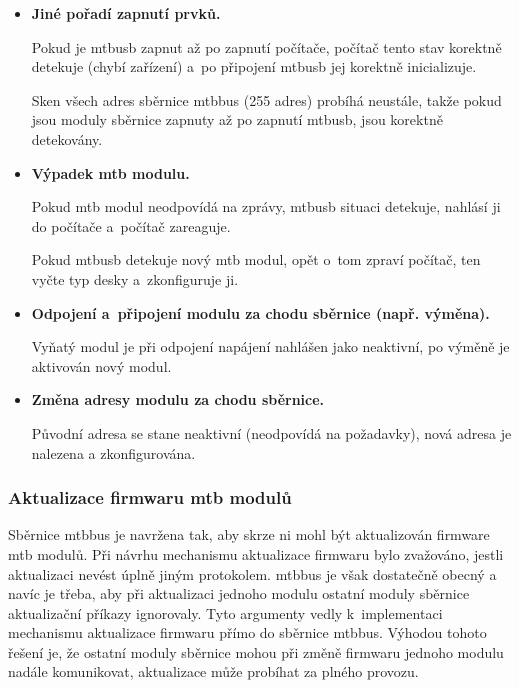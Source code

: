 \begin{itemize}
\item \textbf{Jiné pořadí zapnutí prvků.}

Pokud je \gls{mtbusb} zapnut až po zapnutí počítače, počítač tento stav
korektně detekuje (chybí zařízení) a~po připojení \gls{mtbusb} jej korektně
inicializuje.

Sken všech adres sběrnice \gls{mtbbus} (255 adres) probíhá neustále, takže
pokud jsou moduly sběrnice zapnuty až po zapnutí \gls{mtbusb}, jsou korektně
detekovány.

\item \textbf{Výpadek \gls{mtb} modulu.}

Pokud \gls{mtb} modul neodpovídá na zprávy, \gls{mtbusb} situaci detekuje,
nahlásí ji do počítače a~počítač zareaguje.

Pokud \gls{mtbusb} detekuje nový \gls{mtb} modul, opět o~tom zpraví
počítač, ten vyčte typ desky a~zkonfiguruje ji.

\item \textbf{Odpojení a~připojení modulu za chodu sběrnice (např. výměna).}

Vyňatý modul je při odpojení napájení nahlášen jako neaktivní, po výměně je
aktivován nový modul.

\item \textbf{Změna adresy modulu za chodu sběrnice.}

Původní adresa se stane neaktivní (neodpovídá na požadavky), nová adresa
je nalezena a zkonfigurována.

\end{itemize}


\subsubsection{\textbf{Aktualizace firmwaru \gls{mtb} modulů}} \label{subsub:fw_uprage}

Sběrnice \gls{mtbbus} je navržena tak, aby skrze ni mohl být aktualizován
firmware \gls{mtb} modulů. Při návrhu mechanismu aktualizace firmwaru bylo
zvažováno, jestli aktualizaci nevést úplně jiným protokolem.
\mbox{\gls{mtbbus}} je však dostatečně obecný a navíc je třeba, aby
při aktualizaci jednoho modulu ostatní moduly sběrnice aktualizační příkazy
ignorovaly. Tyto argumenty vedly k~implementaci
mechanismu aktualizace firmwaru přímo do sběrnice \gls{mtbbus}. Výhodou tohoto
řešení je, že ostatní moduly sběrnice mohou při změně firmwaru jednoho
modulu nadále komunikovat, aktualizace může probíhat za plného provozu.

